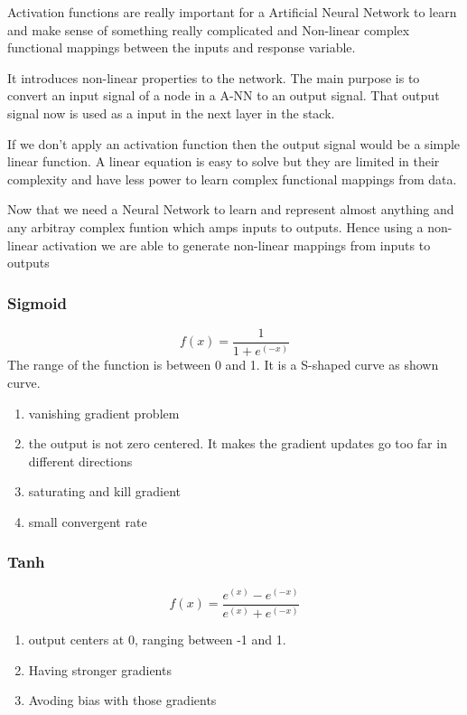 \documentclass[11pt]{article}
\providecommand{\tightlist}{%
      \setlength{\itemsep}{0pt}\setlength{\parskip}{0pt}}
\begin{document}
Activation functions are really important for a Artificial Neural
Network to learn and make sense of something really complicated and
Non-linear complex functional mappings between the inputs and response
variable.

It introduces non-linear properties to the network. The main purpose is
to convert an input signal of a node in a A-NN to an output signal. That
output signal now is used as a input in the next layer in the stack.

If we don't apply an activation function then the output signal would be
a simple linear function. A linear equation is easy to solve but they
are limited in their complexity and have less power to learn complex
functional mappings from data.

Now that we need a Neural Network to learn and represent almost anything
and any arbitray complex funtion which amps inputs to outputs. Hence
using a non-linear activation we are able to generate non-linear
mappings from inputs to outputs

    \hypertarget{sigmoid}{%
\subsubsection{Sigmoid}\label{sigmoid}}

\[
f(x) = \frac{1}{1+e^{(-x)}}
\] The range of the function is between 0 and 1. It is a S-shaped curve
as shown curve.

\begin{enumerate}
\def\labelenumi{\arabic{enumi}.}
\tightlist
\item
  vanishing gradient problem
\item
  the output is not zero centered. It makes the gradient updates go too
  far in different directions
\item
  saturating and kill gradient
\item
  small convergent rate
\end{enumerate}

    \hypertarget{tanh}{%
\subsubsection{Tanh}\label{tanh}}

\[
f(x) = \frac{e^{(x)} - e^{(-x)}}{e^{(x)}+e^{(-x)}}
\]

\begin{enumerate}
\def\labelenumi{\arabic{enumi}.}
\tightlist
\item
  output centers at 0, ranging between -1 and 1.
\item
  Having stronger gradients
\item
  Avoding bias with those gradients
\end{enumerate}
\end{document}
